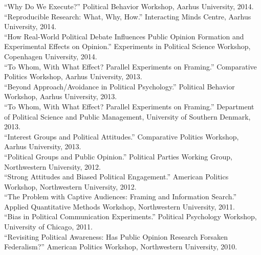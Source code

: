 \documentclass[12pt]{article}
\newcommand{\entry}[1]{\indent {\color{lg}\guillemotright}\hspace{2pt}#1\vspace{.25em}\\}
\begin{document}
	\entry{``Why Do We Execute?'' Political Behavior Workshop, Aarhus University, 2014.}
	\entry{``Reproducible Research: What, Why, How.'' Interacting Minds Centre, Aarhus University, 2014.}
	\entry{``How Real-World Political Debate Influences Public Opinion Formation and Experimental Effects on Opinion.'' Experiments in Political Science Workshop, Copenhagen University, 2014.}
	\entry{``To Whom, With What Effect? Parallel Experiments on Framing.'' Comparative Politics Workshop, Aarhus University, 2013.}
	\entry{``Beyond Approach/Avoidance in Political Psychology.'' Political Behavior Workshop, Aarhus University, 2013.}
	\entry{``To Whom, With What Effect? Parallel Experiments on Framing.'' Department of Political Science and Public Management, University of Southern Denmark, 2013.}
	\entry{``Interest Groups and Political Attitudes.'' Comparative Politics Workshop, Aarhus University, 2013.}
	\entry{``Political Groups and Public Opinion.'' Political Parties Working Group, Northwestern University, 2012.}
	\entry{``Strong Attitudes and Biased Political Engagement.'' American Politics Workshop, Northwestern University, 2012.}
	\entry{``The Problem with Captive Audiences: Framing and Information Search.'' Applied Quantitative Methods Workshop, Northwestern University, 2011.}
	\entry{``Bias in Political Communication Experiments.'' Political Psychology Workshop, University of Chicago, 2011.}
	\entry{``Revisiting Political Awareness: Has Public Opinion Research Forsaken Federalism?'' American Politics Workshop, Northwestern University, 2010.}
\end{document}
